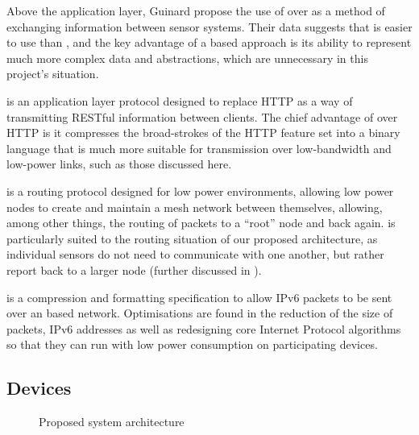 \documentclass[../thesis/thesis.tex]{subfiles}
\begin{document}
Above the application layer, Guinard \etal \cite{guinard2012search} propose the use of \rest over \ws as a method of exchanging information between sensor systems. Their data suggests that \rest is easier to use than \ws, and the key advantage of a \ws based approach is its ability to represent much more complex data and abstractions, which are unnecessary in this project's situation.

\coap \cite{kovatsch2013coap} is an application layer protocol designed to replace HTTP as a way of transmitting RESTful information between clients. The chief advantage of \coap over HTTP is it compresses the broad-strokes of the HTTP feature set into a binary language that is much more suitable for transmission over low-bandwidth and low-power links, such as those discussed here.

\roll \cite{rfc6550} is a routing protocol designed for low power environments, allowing low power nodes to create and maintain a mesh network between themselves, allowing, among other things, the routing of packets to a ``root'' node and back again. \roll is particularly suited to the routing situation of our proposed architecture, as individual sensors do not need to communicate with one another, but rather report back to a larger node (further discussed in ).

\lowpan \cite{shelby20116lowpan} is a compression and formatting specification to allow IPv6 packets to be sent over an \lwifi based network. Optimisations are found in the reduction of the size of \lowpan packets, IPv6 addresses as well as redesigning core Internet Protocol algorithms so that they can run with low power consumption on participating devices.

\subsection{Devices}
\label{subsec:litreview:architecture:devices}
\begin{figure}
\centering
{}
\caption{Proposed system architecture}
\label{fig:litreview:devices}
\end{figure}
\end{document}
